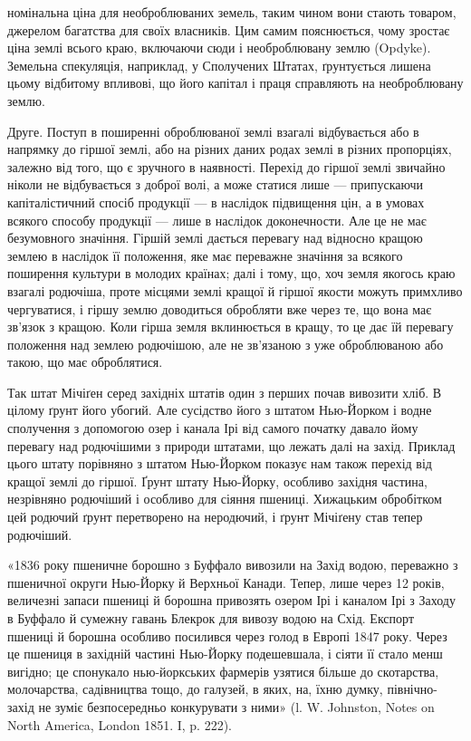 \parcont{}  %
номінальна ціна для необроблюваних земель, таким чином вони стають товаром,
джерелом багатства для своїх власників. Цим самим пояснюється, чому зростає ціна
землі всього краю, включаючи сюди і необроблювану землю (Opdyke).
Земельна спекуляція, наприклад, у Сполучених Штатах, ґрунтується лишена цьому
відбитому впливові, що його капітал і праця справляють на необроблювану землю.

Друге. Поступ в поширенні оброблюваної землі взагалі відбувається або в
напрямку до гіршої землі, або на різних даних родах землі в різних пропорціях,
залежно від того, що є зручного в наявності. Перехід до гіршої землі звичайно
ніколи не відбувається з доброї волі, а може статися лише — припускаючи капіталістичний спосіб
продукції — в наслідок підвищення цін, а в умовах всякого
способу продукції — лише в наслідок доконечности. Але це не має безумовного значіння. Гіршій землі
дається перевагу над відносно кращою землею в наслідок
її положення, яке має переважне значіння за всякого поширення культури
в молодих країнах; далі і тому, що, хоч земля якогось краю взагалі родючіша,
проте місцями землі кращої й гіршої якости можуть примхливо чергуватися, і
гіршу землю доводиться обробляти вже через те, що вона має зв’язок з кращою.
Коли гірша земля вклинюється в кращу, то це дає їй перевагу положення
над землею родючішою, але не зв’язаною з уже оброблюваною або такою, що має
оброблятися.

Так штат Мічіґен серед західніх штатів один з перших почав вивозити
хліб. В цілому ґрунт його убогий. Але сусідство його з штатом Нью-Йорком і
водне сполучення з допомогою озер і канала Ірі від самого початку давало йому
перевагу над родючішими з природи штатами, що лежать далі на захід.
Приклад цього штату порівняно з штатом Нью-Йорком показує нам також
перехід від кращої землі до гіршої. Ґрунт штату Нью-Йорку, особливо західня
частина, незрівняно родючіший і особливо для сіяння пшениці. Хижацьким обробітком
цей родючий ґрунт перетворено на неродючий, і ґрунт Мічіґену став тепер
родючіший.

«1836 року пшеничне борошно з Буффало вивозили на Захід водою, переважно
з пшеничної округи Нью-Йорку й Верхньої Канади. Тепер, лише через
12 років, величезні запаси пшениці й борошна привозять озером Ірі і каналом
Ірі з Заходу в Буффало й сумежну гавань Блекрок для вивозу водою на
Схід. Експорт пшениці й борошна особливо посилився через голод в Европі
1847 року. Через це пшениця в західній частині Нью-Йорку подешевшала, і
сіяти її стало менш вигідно; це спонукало нью-йоркських фармерів узятися
більше до скотарства, молочарства, садівництва тощо, до галузей, в яких, на,
їхню думку, північно-захід не зуміє безпосередньо конкурувати з ними» (l. W.
Johnston, Notes on North America, London 1851. I, p. 222).

